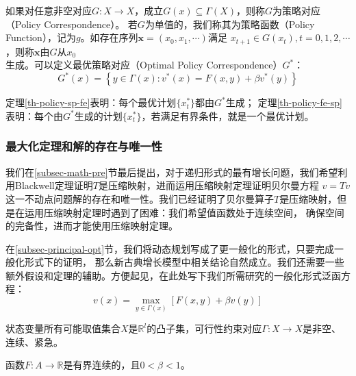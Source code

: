 \begin{definition}
    如果对任意非空对应$G: X\rightarrow X$，成立$G\left(x\right)\subseteq \Gamma\left(X\right)$，则称$G$为策略对应（Policy Correspondence）。
    若$G$为单值的，我们称其为策略函数（Policy Function），记为$g$。如存在序列$\boldsymbol{x}=\left(x_0,x_1,\cdots\right)$满足
    $x_{t+1}\in G\left(x_t\right), t=0,1,2,\cdots$，则称$\boldsymbol{x}$由$G$从$x_0$生成。可以定义最优策略对应（Optimal Policy Correspondence）$G^*$：
    $$
    G^*(x)=\left\{y \in \Gamma(x): v^*(x)=F(x, y)+\beta v^*(y)\right\}
    $$
\end{definition}
定理\ref{th-policy-sp-fe}表明：每个最优计划$\{x_t^*\}$都由$G^*$生成；
定理\ref{th-policy-fe-sp}表明：每个由$G^*$生成的计划$\{x_t^*\}$，若满足有界条件，就是一个最优计划。


\subsubsection{最大化定理和解的存在与唯一性}

我们在\ref{subsec-math-pre}节最后提出，对于递归形式的最有增长问题，我们希望利用Blackwell定理证明$T$是压缩映射，进而运用压缩映射定理证明贝尔曼方程
$v=Tv$这一不动点问题解的存在和唯一性。我们已经证明了贝尔曼算子$T$是压缩映射，但是在运用压缩映射定理时遇到了困难：我们希望值函数处于连续空间，
确保空间的完备性，进而才能使用压缩映射定理。

在\ref{subsec-principal-opt}节，我们将动态规划写成了更一般化的形式，只要完成一般化形式下的证明，
那么新古典增长模型中相关结论自然成立。我们还需要一些额外假设和定理的辅助。方便起见，在此处写下我们所需研究的一般化形式泛函方程：
\begin{equation}    \label{eq-general-fe}
    v\left(x\right)=\max_{y\in\Gamma\left(x\right)}\left[F\left(x,y\right)+\beta v\left(y\right)\right]
\end{equation}

\begin{assumption}[凸性假设] \label{as-convex-X}
    状态变量所有可能取值集合$X$是$\mathbb{R}^l$的凸子集，可行性约束对应$\Gamma :X\rightarrow X$是非空、连续、紧急。
\end{assumption}

\begin{assumption}[有界回报]  \label{as-bounded-returns}
    函数$F: A\rightarrow \mathbb{R}$是有界连续的，且$0<\beta<1$。
\end{assumption}


